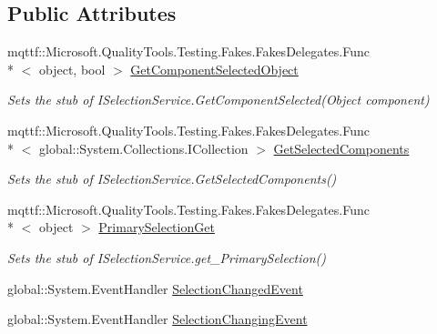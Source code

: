 \subsection*{Public Attributes}
\begin{DoxyCompactItemize}
\item 
mqttf\-::\-Microsoft.\-Quality\-Tools.\-Testing.\-Fakes.\-Fakes\-Delegates.\-Func\\*
$<$ object, bool $>$ \hyperlink{class_system_1_1_component_model_1_1_design_1_1_fakes_1_1_stub_i_selection_service_ac8a79f1419a8743b6bed8453b73d7d0e}{Get\-Component\-Selected\-Object}
\begin{DoxyCompactList}\small\item\em Sets the stub of I\-Selection\-Service.\-Get\-Component\-Selected(\-Object component)\end{DoxyCompactList}\item 
mqttf\-::\-Microsoft.\-Quality\-Tools.\-Testing.\-Fakes.\-Fakes\-Delegates.\-Func\\*
$<$ global\-::\-System.\-Collections.\-I\-Collection $>$ \hyperlink{class_system_1_1_component_model_1_1_design_1_1_fakes_1_1_stub_i_selection_service_af383e04b4fc7eb6fa79a93329a150d3b}{Get\-Selected\-Components}
\begin{DoxyCompactList}\small\item\em Sets the stub of I\-Selection\-Service.\-Get\-Selected\-Components()\end{DoxyCompactList}\item 
mqttf\-::\-Microsoft.\-Quality\-Tools.\-Testing.\-Fakes.\-Fakes\-Delegates.\-Func\\*
$<$ object $>$ \hyperlink{class_system_1_1_component_model_1_1_design_1_1_fakes_1_1_stub_i_selection_service_ad4a2c4fd61b45f7a77807422ff83f70f}{Primary\-Selection\-Get}
\begin{DoxyCompactList}\small\item\em Sets the stub of I\-Selection\-Service.\-get\-\_\-\-Primary\-Selection()\end{DoxyCompactList}\item 
global\-::\-System.\-Event\-Handler \hyperlink{class_system_1_1_component_model_1_1_design_1_1_fakes_1_1_stub_i_selection_service_af765ea6d1702205e1c4bb8b47987ad66}{Selection\-Changed\-Event}
\item 
global\-::\-System.\-Event\-Handler \hyperlink{class_system_1_1_component_model_1_1_design_1_1_fakes_1_1_stub_i_selection_service_a1b36f4091eff982d5176ecfc57704f56}{Selection\-Changing\-Event}
\item 

\end{DoxyCompactItemize}

